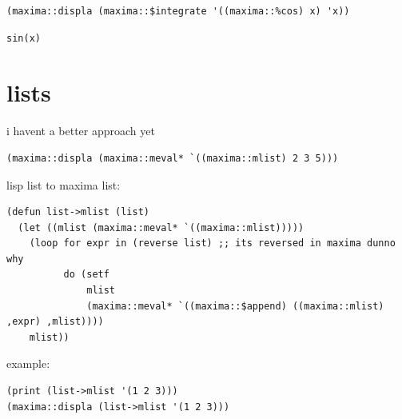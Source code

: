 \documentclass[a4paper,12pt]{article}
\begin{document}
\lstset{language=Lisp,label= ,caption= ,captionpos=b,numbers=none}
\begin{lstlisting}
(maxima::displa (maxima::$integrate '((maxima::%cos) x) 'x))
\end{lstlisting}

\begin{verbatim}
sin(x)
\end{verbatim}

\section{lists}
\label{sec:orgadeb7e9}
i havent a better approach yet\\
\lstset{language=Lisp,label= ,caption= ,captionpos=b,numbers=none}
\begin{lstlisting}
(maxima::displa (maxima::meval* `((maxima::mlist) 2 3 5)))
\end{lstlisting}

lisp list to maxima list:\\
\lstset{language=Lisp,label= ,caption= ,captionpos=b,numbers=none}
\begin{lstlisting}
(defun list->mlist (list)
  (let ((mlist (maxima::meval* `((maxima::mlist)))))
    (loop for expr in (reverse list) ;; its reversed in maxima dunno why
          do (setf
              mlist
              (maxima::meval* `((maxima::$append) ((maxima::mlist) ,expr) ,mlist))))
    mlist))
\end{lstlisting}
example:\\
\lstset{language=Lisp,label= ,caption= ,captionpos=b,numbers=none}
\begin{lstlisting}
(print (list->mlist '(1 2 3)))
(maxima::displa (list->mlist '(1 2 3)))
\end{lstlisting}
\end{document}
